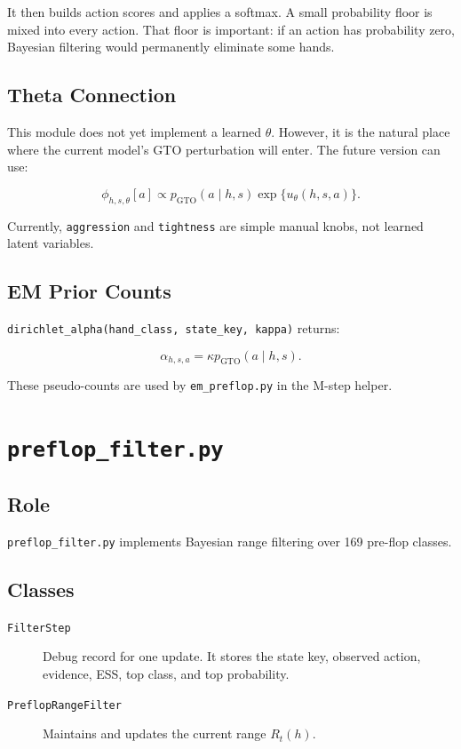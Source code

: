 \documentclass[11pt]{article}
\begin{document}
It then builds action scores and applies a softmax. A small probability floor is
mixed into every action. That floor is important: if an action has probability
zero, Bayesian filtering would permanently eliminate some hands.

\subsection{Theta Connection}

This module does not yet implement a learned \(\theta\). However, it is the
natural place where the current model's GTO perturbation will enter. The future
version can use:

\[
\phi_{h,s,\theta}[a]
\propto
p_{\mathrm{GTO}}(a\mid h,s)
\exp\{u_\theta(h,s,a)\}.
\]

Currently, \texttt{aggression} and \texttt{tightness} are simple manual knobs,
not learned latent variables.

\subsection{EM Prior Counts}

\texttt{dirichlet\_alpha(hand\_class, state\_key, kappa)} returns:

\[
\alpha_{h,s,a}
=
\kappa p_{\mathrm{GTO}}(a\mid h,s).
\]

These pseudo-counts are used by \texttt{em\_preflop.py} in the M-step helper.

\section{\texttt{preflop\_filter.py}}

\subsection{Role}

\texttt{preflop\_filter.py} implements Bayesian range filtering over 169
pre-flop classes.

\subsection{Classes}

\begin{description}
  \item[\texttt{FilterStep}] Debug record for one update. It stores the state
  key, observed action, evidence, ESS, top class, and top probability.
  \item[\texttt{PreflopRangeFilter}] Maintains and updates the current range
  \(R_t(h)\).
\end{description}
\end{document}
